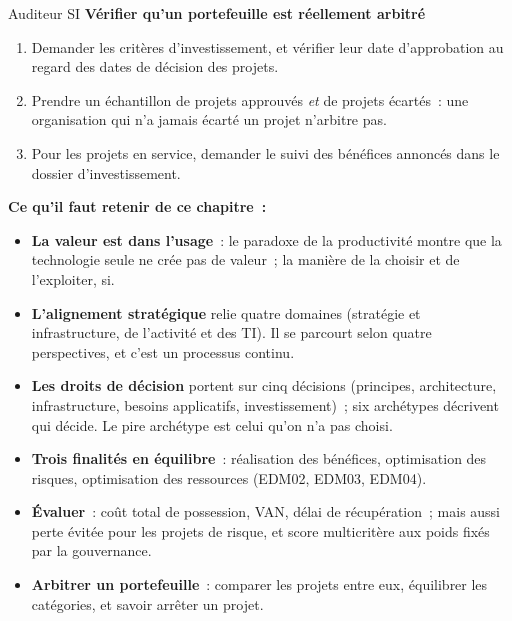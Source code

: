 \begin{boxmetier}{Auditeur SI}
\textbf{Vérifier qu'un portefeuille est réellement arbitré}
\begin{enumerate}
    \item Demander les critères d'investissement, et vérifier leur date
          d'approbation au regard des dates de décision des projets.
    \item Prendre un échantillon de projets approuvés \emph{et} de projets
          écartés~: une organisation qui n'a jamais écarté un projet
          n'arbitre pas.
    \item Pour les projets en service, demander le suivi des bénéfices
          annoncés dans le dossier d'investissement.
\end{enumerate}
\end{boxmetier}

\separateur

\begin{boxresume}
\textbf{Ce qu'il faut retenir de ce chapitre~:}
\begin{itemize}
    \item \textbf{La valeur est dans l'usage}~: le paradoxe de la
          productivité montre que la technologie seule ne crée pas de
          valeur~; la manière de la choisir et de l'exploiter, si.
    \item \textbf{L'alignement stratégique} relie quatre domaines (stratégie
          et infrastructure, de l'activité et des TI). Il se parcourt selon
          quatre perspectives, et c'est un processus continu.
    \item \textbf{Les droits de décision} portent sur cinq décisions
          (principes, architecture, infrastructure, besoins applicatifs,
          investissement)~; six archétypes décrivent qui décide. Le pire
          archétype est celui qu'on n'a pas choisi.
    \item \textbf{Trois finalités en équilibre}~: réalisation des
          bénéfices, optimisation des risques, optimisation des ressources
          (EDM02, EDM03, EDM04).
    \item \textbf{Évaluer}~: coût total de possession, VAN, délai de
          récupération~; mais aussi perte évitée pour les projets de
          risque, et score multicritère aux poids fixés par la gouvernance.
    \item \textbf{Arbitrer un portefeuille}~: comparer les projets entre
          eux, équilibrer les catégories, et savoir arrêter un projet.
\end{itemize}
\end{boxresume}

